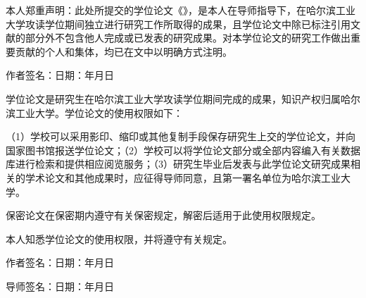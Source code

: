 
\vspace{\baselineskip}
\begin{center}\hei{}\end{center}
\vspace{1em}

本人郑重声明：此处所提交的学位论文《\chinesethesistitle》，是本人在导师指导下，在哈尔滨工业大学攻读学位期间独立进行研究工作所取得的成果，且学位论文中除已标注引用文献的部分外不包含他人完成或已发表的研究成果。对本学位论文的研究工作做出重要贡献的个人和集体，均已在文中以明确方式注明。

\vspace{\baselineskip}
\hspace{6em}作者签名：\hfill 日期：\hspace{2.5em}年\hspace{1.5em}月\hspace{1.5em}日

\vspace{2\baselineskip}
\begin{center}\hei{}\end{center}
\vspace{1em}

学位论文是研究生在哈尔滨工业大学攻读学位期间完成的成果，知识产权归属哈尔滨工业大学。学位论文的使用权限如下：

（1）学校可以采用影印、缩印或其他复制手段保存研究生上交的学位论文，并向国家图书馆报送学位论文；（2）学校可以将学位论文部分或全部内容编入有关数据库进行检索和提供相应阅览服务；（3）研究生毕业后发表与此学位论文研究成果相关的学术论文和其他成果时，应征得导师同意，且第一署名单位为哈尔滨工业大学。

保密论文在保密期内遵守有关保密规定，解密后适用于此使用权限规定。

本人知悉学位论文的使用权限，并将遵守有关规定。


\vspace{2\baselineskip}
\hspace{6em}作者签名：\hfill 日期：\hspace{2.5em}年\hspace{1.5em}月\hspace{1.5em}日

\vspace{2\baselineskip}
\hspace{6em}导师签名：\hfill 日期：\hspace{2.5em}年\hspace{1.5em}月\hspace{1.5em}日